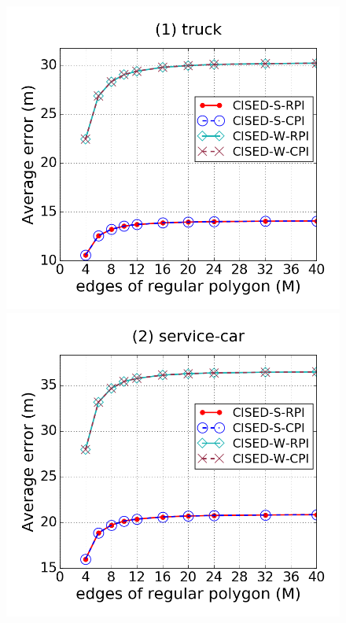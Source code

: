 

\begin{figure}[tb!]
\centering
\includegraphics[scale = 0.250]{figures/Exp-M-e-60-error-truck.png}
\includegraphics[scale = 0.250]{figures/Exp-M-e-60-error-service.png}

\end{figure}
